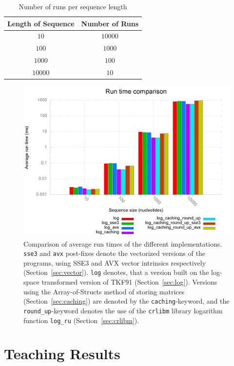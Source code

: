 \documentclass[runningheads,a4paper]{llncs}
\begin{document}
\begin{table}
\centering

\begin{tabular}{|c|c|}
\hline 
Length of Sequence & Number of Runs \\ 
\hline 
$10$ & $10000$ \\ 
\hline 
$100$ & $1000$ \\ 
\hline 
$1000$ & $100$ \\ 
\hline 
$10000$ & $10$ \\ 
\hline 
\end{tabular}
\caption{Number of runs per sequence length}
\label{fig:runs}
\end{table}

\begin{figure}[h!]
\includegraphics[width=\textwidth]{images/benchplot.png}
    \caption{Comparison of average run times of the different implementations. \texttt{sse3} and \texttt{avx} post-fixes denote the vectorized versions of the programs, using SSE3 and AVX vector intrinsics respectively (Section~\ref{sec:vector}). \texttt{log} denotes, that a version built on the log-space transformed version of TKF91 (Section~\ref{sec:log}). Versions using the Array-of-Structs method of storing matrices (Section~\ref{sec:caching}) are denoted by the \texttt{caching}-keyword, and the \texttt{round\_up}-keyword denotes the use of the \texttt{crlibm} library logarithm function \texttt{log\_ru} (Section~\ref{sec:crlibm}).}
\label{fig:runtime}
\end{figure}

\section{Teaching Results} 
\label{teaching-results} 
\end{document}
